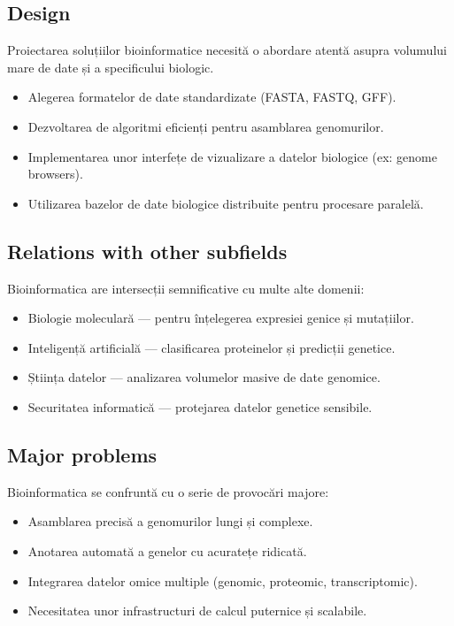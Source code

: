 \documentclass[12pt, letterpaper]{article}
\begin{document}
\subsection*{Design}
Proiectarea soluțiilor bioinformatice necesită o abordare atentă asupra volumului mare de date și a specificului biologic.
\begin{itemize}
    \item Alegerea formatelor de date standardizate (FASTA, FASTQ, GFF).
    \item Dezvoltarea de algoritmi eficienți pentru asamblarea genomurilor.
    \item Implementarea unor interfețe de vizualizare a datelor biologice (ex: genome browsers).
    \item Utilizarea bazelor de date biologice distribuite pentru procesare paralelă.
\end{itemize}

\subsection*{Relations with other subfields}
Bioinformatica are intersecții semnificative cu multe alte domenii:
\begin{itemize}
    \item Biologie moleculară — pentru înțelegerea expresiei genice și mutațiilor.
    \item Inteligență artificială — clasificarea proteinelor și predicții genetice.
    \item Știința datelor — analizarea volumelor masive de date genomice.
    \item Securitatea informatică — protejarea datelor genetice sensibile.
\end{itemize}

\subsection*{Major problems}
Bioinformatica se confruntă cu o serie de provocări majore:
\begin{itemize}
    \item Asamblarea precisă a genomurilor lungi și complexe.
    \item Anotarea automată a genelor cu acuratețe ridicată.
    \item Integrarea datelor omice multiple (genomic, proteomic, transcriptomic).
    \item Necesitatea unor infrastructuri de calcul puternice și scalabile.
\end{itemize}
\end{document}
